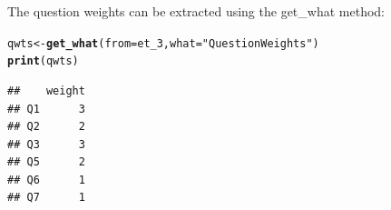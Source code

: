 \documentclass[11pt]{report}\usepackage[]{graphicx}\usepackage[]{xcolor}
\makeatletter
\newcommand{\hlstr}[1]{\textcolor[rgb]{0.192,0.494,0.8}{#1}}%
\newcommand{\hlstd}[1]{\textcolor[rgb]{0.345,0.345,0.345}{#1}}%
\newcommand{\hlkwb}[1]{\textcolor[rgb]{0.69,0.353,0.396}{#1}}%
\newcommand{\hlkwc}[1]{\textcolor[rgb]{0.333,0.667,0.333}{#1}}%
\newcommand{\hlkwd}[1]{\textcolor[rgb]{0.737,0.353,0.396}{\textbf{#1}}}%
\newenvironment{kframe}{%
 \def\at@end@of@kframe{}%
 \ifinner\ifhmode%
  \def\at@end@of@kframe{\end{minipage}}%
  \begin{minipage}{\columnwidth}%
 \fi\fi%
 \def\FrameCommand##1{\hskip\@totalleftmargin \hskip-\fboxsep
 \colorbox{shadecolor}{##1}\hskip-\fboxsep
     \hskip-\linewidth \hskip-\@totalleftmargin \hskip\columnwidth}%
 \MakeFramed {\advance\hsize-\width
   \@totalleftmargin\z@ \linewidth\hsize
   \@setminipage}}%
 {\par\unskip\endMakeFramed%
 \at@end@of@kframe}
\newenvironment{knitrout}{}{} %
\makeatother
\begin{document}
The question weights can be extracted using the \textsf{get\_what} method:
\begin{knitrout}
\color{fgcolor}\begin{kframe}
\begin{alltt}
\hlstd{qwts} \hlkwb{<-} \hlkwd{get_what}\hlstd{(}\hlkwc{from} \hlstd{= et_3,} \hlkwc{what} \hlstd{=} \hlstr{"QuestionWeights"}\hlstd{)}
\hlkwd{print}\hlstd{(qwts)}
\end{alltt}
\begin{verbatim}
##    weight
## Q1      3
## Q2      2
## Q3      3
## Q5      2
## Q6      1
## Q7      1
\end{verbatim}
\end{kframe}
\end{knitrout}
\end{document}
